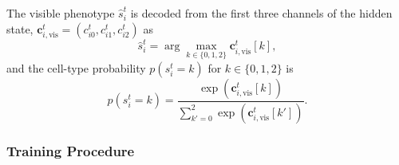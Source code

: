 \documentclass[letterpaper]{article}
\newcommand{\bh}[1]{{\color{black}#1}}  %
\begin{document}
The visible phenotype $\hat{s}_i^t$ is decoded from the first three channels of the hidden state,
\bh{$\mathbf{c}_{i,\mathrm{vis}}^t=({c}_{i0}^t, {c}_{i1}^t, {c}_{i2}^t)$ as
\begin{equation}
    \hat{s}_i^t=\arg\max_{k\in\{0,1,2\}} \mathbf{c}_{i,\mathrm{vis}}^t[k], 
\end{equation}
and the cell-type probability $p(s_i^t = k)$ for $k\in\{0,1,2\}$ is
\begin{equation}
p(s_i^t = k)=\frac{\exp(\mathbf{c}_{i,\mathrm{vis}}^t[k])}
{\sum_{k'=0}^{2}\exp(\mathbf{c}_{i,\mathrm{vis}}^t[k'])}.
\end{equation}}
% 




\subsubsection{Training Procedure}
\end{document}
